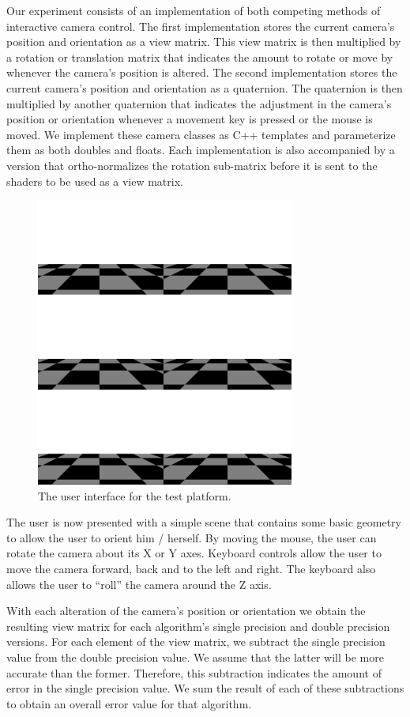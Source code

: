 \documentclass{acm_proc_article-sp}
\begin{document}
Our experiment consists of an implementation of both competing methods of interactive camera control.
The first implementation stores the current camera's position and orientation as a view matrix.
This view matrix is then multiplied by a rotation or translation matrix that indicates the amount to rotate or move by whenever the camera's position is altered.
The second implementation stores the current camera's position and orientation as a quaternion.
The quaternion is then multiplied by another quaternion that indicates the adjustment in the camera's position or orientation whenever a movement key is pressed or the mouse is moved.
We implement these camera classes as C++ templates and parameterize them as both doubles and floats.
Each implementation is also accompanied by a version that ortho-normalizes the rotation sub-matrix before it is sent to the shaders to be used as a view matrix.

\begin{figure}
\includegraphics[width=8.5cm]{user_interface.png}
\caption{The user interface for the test platform.}
\end{figure}

The user is now presented with a simple scene that contains some basic geometry to allow the user to orient him / herself.
By moving the mouse, the user can rotate the camera about its X or Y axes.
Keyboard controls allow the user to move the camera forward, back and to the left and right.
The keyboard also allows the user to ``roll'' the camera around the Z axis.

With each alteration of the camera's position or orientation we obtain the resulting view matrix for each algorithm's single precision and double precision versions.
For each element of the view matrix, we subtract the single precision value from the double precision value.
We assume that the latter will be more accurate than the former.
Therefore, this subtraction indicates the amount of error in the single precision value.
We sum the result of each of these subtractions to obtain an overall error value for that algorithm.
\end{document}
